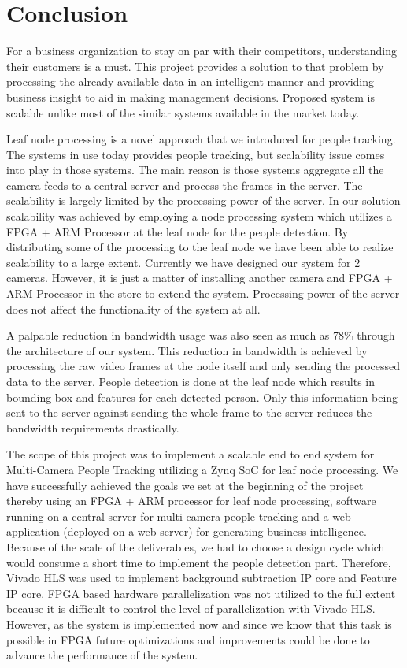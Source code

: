 \documentclass[12pt,a4paper]{report}
\begin{document}
\chapter{Conclusion}

For a business organization to stay on par with their competitors, understanding their customers is a must. This project provides a solution to that problem by processing the already available data in an intelligent manner and providing business insight to aid in making management decisions. Proposed system is scalable unlike most of the similar systems available in the market today.\\
\par Leaf node processing is a novel approach that we introduced for people tracking. The systems in use today provides people tracking, but scalability issue comes into play in those systems. The main reason is those systems aggregate all the camera feeds to a central server and process the frames in the server. The scalability is largely limited by the processing power of the server. In our solution scalability was achieved by employing a node processing system which utilizes a FPGA + ARM Processor at the leaf node for the people detection. By distributing some of the processing to the leaf node we have been able to realize scalability to a large extent. Currently we have designed our system for 2 cameras. However, it is just a matter of installing another camera and FPGA + ARM Processor in the store to extend the system. Processing power of the server does not affect the functionality of the system at all.\\
\par A palpable reduction in bandwidth usage was also seen as much as 78\% through the architecture of our system. This reduction in bandwidth is achieved by processing the raw video frames at the node itself and only sending the processed data to the server. People detection is done at the leaf node which results in bounding box and features for each detected person.  Only this information being sent to the server against sending the whole frame to the server reduces the bandwidth requirements drastically. \\
\par The scope of this project was to implement a scalable end to end system for Multi-Camera People Tracking utilizing a Zynq SoC for leaf node processing. We have successfully achieved the goals we set at the beginning of the project thereby using an FPGA + ARM processor for leaf node processing, software running on a central server for multi-camera people tracking and a web application (deployed on a web server) for generating business intelligence. Because of the scale of the deliverables, we had to choose a design cycle which would consume a short time to implement the people detection part. Therefore, Vivado HLS was used to implement background subtraction IP core and Feature IP core. FPGA based hardware parallelization was not utilized to the full extent because it is difficult to control the level of parallelization with Vivado HLS. However, as the system is implemented now and since we know that this task is possible in FPGA future optimizations and improvements could be done to advance the performance of the system.\\
\end{document}
